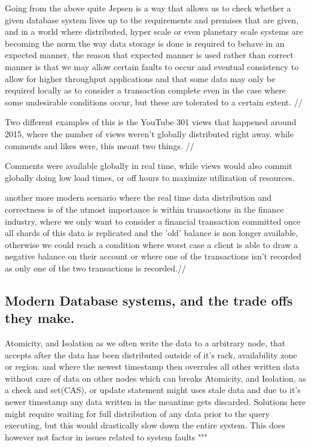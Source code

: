 \documentclass[a4paper,10pt,titlepage]{report}
\begin{document}
Going from the above quite Jepsen is a way that allows us to check whether a given database system lives up to the requirements and premises that are given, and in a world where distributed, hyper scale or even planetary scale systems are becoming the norm the way data storage is done is required to behave in an expected manner, the reason that expected manner is used rather than correct manner is that we may allow certain faults to occur and eventual consistency to allow for higher throughput applications and that some data may only be required locally as to consider a transaction complete even in the case where some undesirable conditions occur, but these are tolerated to a certain extent. //

Two different examples of this is the YouTube 301 views that happened around 2015, where the number of views weren't globally distributed right away. while comments and likes were, this meant two things. //

Comments were available globally in real time, while views would also commit globally doing low load times, or off hours to maximize utilization of resources.

another more modern scenario where the real time data distribution and correctness is of the utmost importance is within transactions in the finance industry,  where we only want to consider a financial transaction committed once all shards of this data is replicated and the 'old' balance is non longer available, otherwise we could reach a condition where worst case a client is able to draw a negative balance on their account or where one of the transactions isn't recorded as only one of the two transactions is recorded.//




\subsection{Modern Database systems, and the trade offs they make.}


Atomicity, and Isolation as we often write the data to a arbitrary node, that accepts after the data has been distributed outside of it's rack, availability zone or region. and where the newest timestamp then overrules all other written data without care of data on other nodes which can breaks Atomicity, and Isolation, as a check and set(CAS), or update statement might uses stale data and due to it's newer timestamp any data written in the meantime gets discarded. Solutions here might require waiting for full distribution of any data prior to the query executing, but this would drastically slow down the entire system. This does however not factor in issues related to system faults
"""
\end{document}
